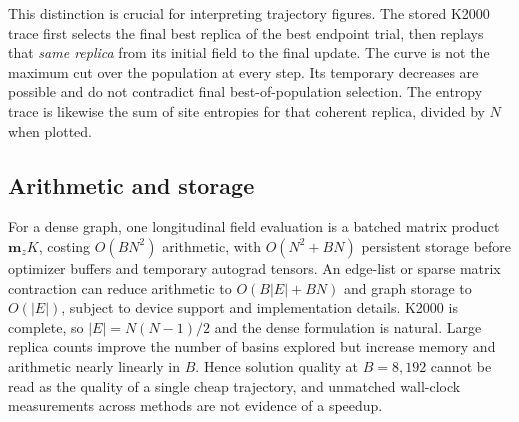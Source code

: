 This distinction is crucial for interpreting trajectory figures. The
stored K2000 trace first selects the final best replica of the best
endpoint trial, then replays that \emph{same replica} from its initial
field to the final update. The curve is not the maximum cut over the
population at every step. Its temporary decreases are possible and do
not contradict final best-of-population selection. The entropy trace is
likewise the sum of site entropies for that coherent replica, divided by
$N$ when plotted.

\subsection{Arithmetic and storage}

For a dense graph, one longitudinal field evaluation is a batched
matrix product $\bm m_zK$, costing $O(BN^2)$ arithmetic, with
$O(N^2+BN)$ persistent storage before optimizer buffers and temporary
autograd tensors. An edge-list or sparse matrix contraction can reduce
arithmetic to $O(B|E|+BN)$ and graph storage to $O(|E|)$, subject to device
support and implementation details. K2000 is complete, so $|E|=N(N-1)/2$
and the dense formulation is natural. Large replica counts improve the
number of basins explored but increase memory and arithmetic nearly
linearly in $B$. Hence solution quality at $B=8{,}192$ cannot be read as
the quality of a single cheap trajectory, and unmatched wall-clock
measurements across methods are not evidence of a speedup.
